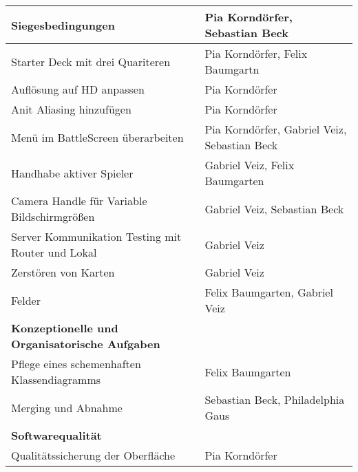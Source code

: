 \begin{longtable}{|p{8cm}|p{10cm}|}
Siegesbedingungen & Pia Korndörfer, Sebastian Beck \\ \hline
Starter Deck mit drei Quariteren & Pia Korndörfer, Felix Baumgartn \\ \hline
Auflösung auf HD anpassen & Pia Korndörfer \\ \hline
Anit Aliasing hinzufügen & Pia Korndörfer \\ \hline
Menü im BattleScreen überarbeiten & Pia Korndörfer, Gabriel Veiz, Sebastian Beck \\ \hline
Handhabe aktiver Spieler & Gabriel Veiz, Felix Baumgarten \\ \hline
Camera Handle für Variable Bildschirmgrößen & Gabriel Veiz, Sebastian Beck \\ \hline
Server Kommunikation Testing mit Router und Lokal & Gabriel Veiz \\ \hline
Zerstören von Karten & Gabriel Veiz \\ \hline
Felder & Felix Baumgarten, Gabriel Veiz \\ \hline
\textbf{Konzeptionelle und Organisatorische Aufgaben} & \\ \hline
Pflege eines schemenhaften Klassendiagramms  & Felix Baumgarten \\ \hline
Merging und Abnahme  & Sebastian Beck, Philadelphia Gaus \\ \hline
\textbf{Softwarequalität} & \\
Qualitätssicherung der Oberfläche & Pia Korndörfer \\ \hline
\hline
\end{longtable}